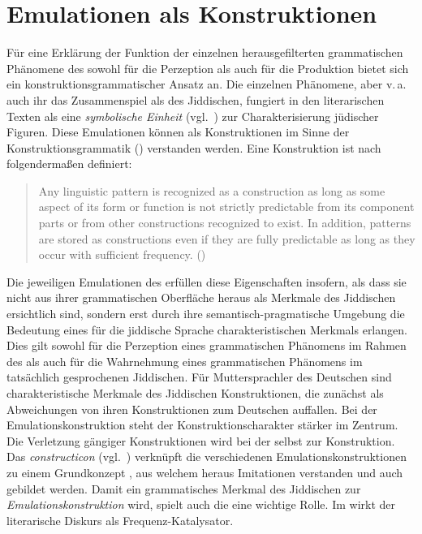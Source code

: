 

\section{Emulationen als Konstruktionen}\label{CxG}

Für eine Erklärung der Funktion der einzelnen herausgefilterten grammatischen Phänomene des \hai{{\LiJi}} sowohl für die Perzeption als auch für die Produktion bietet sich ein konstruktionsgrammatischer Ansatz an. Die einzelnen Phänomene, aber v.\,a.\, auch ihr das Zusammenspiel als  des Jiddischen, fungiert in den literarischen Texten als eine \textit{symbolische Einheit} (vgl.\, \citealt[5]{Goldberg2006}) zur Charakterisierung jüdischer Figuren.  Diese Emulationen können als Konstruktionen im Sinne der Konstruktionsgrammatik (\hai{{\CxG}}) verstanden werden. Eine Konstruktion ist nach \textcite{Goldberg2006} folgendermaßen definiert:

\begin{quotation}
Any linguistic pattern is recognized as a construction as long as some aspect of its form or function is not strictly predictable from its component parts or from other constructions recognized to exist. In addition, patterns are stored as constructions even if they are fully predictable as long as they occur with sufficient frequency.  (\citealt[5]{Goldberg2006})
\end{quotation}


Die jeweiligen Emulationen des \hai{{\LiJi}} erfüllen diese Eigenschaften insofern, als dass sie nicht aus ihrer grammatischen Oberfläche heraus als Merkmale des Jiddischen ersichtlich sind, sondern erst durch ihre semantisch-pragmatische Umgebung die Bedeutung eines für die jiddische Sprache charakteristischen Merkmals erlangen. Dies gilt sowohl für die Perzeption eines grammatischen Phänomens im Rahmen des \hai{{\LiJi}} als auch für die Wahrnehmung eines grammatischen Phänomens im tatsächlich gesprochenen Jiddischen. Für Muttersprachler des Deutschen sind charakteristische Merkmale des Jiddischen Konstruktionen, die zunächst als Abweichungen von ihren Konstruktionen zum Deutschen auffallen. Bei der Emulationskonstruktion steht der Konstruktionscharakter stärker im Zentrum. Die Verletzung gängiger Konstruktionen wird bei der  selbst zur Konstruktion. Das \textit{constructicon} (vgl.\, \citealt{Fillmore2008}) verknüpft die verschiedenen Emulationskonstruktionen zu einem Grundkonzept , aus welchem heraus Imitationen verstanden und auch gebildet werden.  Damit ein grammatisches Merkmal des Jiddischen zur \textit{Emulationskonstruktion} wird, spielt auch die  eine wichtige Rolle. Im \hai{{\LiJi}} wirkt der literarische Diskurs als Frequenz-Katalysator. 

